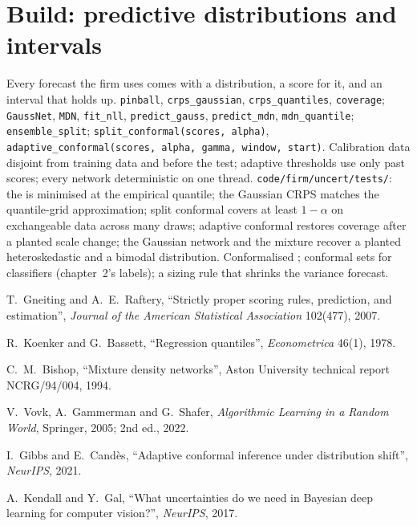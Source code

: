 \section{Build: predictive distributions and intervals}\label{bld:ml:probabilistic-models-and-uncertainty:uncert}

\begin{build}
 Every forecast the firm uses comes with a distribution, a score for it, and an interval that holds up.
 \texttt{pinball}, \texttt{crps\_gaussian}, \texttt{crps\_quantiles}, \texttt{coverage};
\texttt{GaussNet}, \texttt{MDN}, \texttt{fit\_nll}, \texttt{predict\_gauss}, \texttt{predict\_mdn}, \texttt{mdn\_quantile};
\texttt{ensemble\_split}; \texttt{split\_conformal(scores, alpha)}, \texttt{adaptive\_conformal(scores, alpha, gamma,
window, start)}.
 Calibration data disjoint from training data and before the test; adaptive thresholds use only past
scores; every network deterministic on one thread.
 \texttt{code/firm/uncert/tests/}: the  is minimised at the empirical quantile; the
Gaussian CRPS matches the quantile-grid approximation; split conformal covers at least $1 - \alpha$ on exchangeable data
across many draws; adaptive conformal restores coverage after a planted scale change; the Gaussian network and the mixture
recover a planted heteroskedastic and a bimodal distribution.
 Conformalised ; conformal sets for classifiers (chapter~2's labels); a sizing rule
that shrinks the variance forecast.
\end{build}

\begin{omsources}
\item T.~Gneiting and A.~E.~Raftery, ``Strictly proper scoring rules, prediction, and estimation'', \emph{Journal of the
American Statistical Association} 102(477), 2007.
\item R.~Koenker and G.~Bassett, ``Regression quantiles'', \emph{Econometrica} 46(1), 1978.
\item C.~M.~Bishop, ``Mixture density networks'', Aston University technical report NCRG/94/004, 1994.
\item V.~Vovk, A.~Gammerman and G.~Shafer, \emph{Algorithmic Learning in a Random World}, Springer, 2005; 2nd ed., 2022.
\item I.~Gibbs and E.~Candès, ``Adaptive conformal inference under distribution shift'', \emph{NeurIPS}, 2021.
\item A.~Kendall and Y.~Gal, ``What uncertainties do we need in Bayesian deep learning for computer vision?'',
\emph{NeurIPS}, 2017.
\end{omsources}

